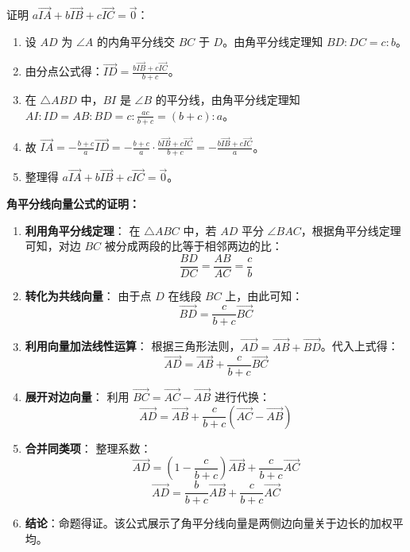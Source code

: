\begin{proofbox}
证明 $a\vec{IA} + b\vec{IB} + c\vec{IC} = \vec{0}$：
\begin{enumerate}
    \item 设 $AD$ 为 $\angle A$ 的内角平分线交 $BC$ 于 $D$。由角平分线定理知 $BD:DC = c:b$。
    \item 由分点公式得：$\vec{ID} = \frac{b\vec{IB} + c\vec{IC}}{b+c}$。
    \item 在 $\triangle ABD$ 中，$BI$ 是 $\angle B$ 的平分线，由角平分线定理知 $AI:ID = AB:BD = c:\frac{ac}{b+c} = (b+c):a$。
    \item 故 $\vec{IA} = -\frac{b+c}{a}\vec{ID} = -\frac{b+c}{a} \cdot \frac{b\vec{IB} + c\vec{IC}}{b+c} = -\frac{b\vec{IB} + c\vec{IC}}{a}$。
    \item 整理得 $a\vec{IA} + b\vec{IB} + c\vec{IC} = \vec{0}$。
\end{enumerate}
\end{proofbox}

\begin{proofbox}
\textbf{角平分线向量公式的证明：}
\begin{enumerate}
    \item \textbf{利用角平分线定理}：
    在 $\triangle ABC$ 中，若 $AD$ 平分 $\angle BAC$，根据角平分线定理可知，对边 $BC$ 被分成两段的比等于相邻两边的比：
    \[ \frac{BD}{DC} = \frac{AB}{AC} = \frac{c}{b} \]
    
    \item \textbf{转化为共线向量}：
    由于点 $D$ 在线段 $BC$ 上，由此可知：
    \[ \vec{BD} = \frac{c}{b+c} \vec{BC} \]
    
    \item \textbf{利用向量加法线性运算}：
    根据三角形法则，$\vec{AD} = \vec{AB} + \vec{BD}$。代入上式得：
    \[ \vec{AD} = \vec{AB} + \frac{c}{b+c} \vec{BC} \]
    
    \item \textbf{展开对边向量}：
    利用 $\vec{BC} = \vec{AC} - \vec{AB}$ 进行代换：
    \[ \vec{AD} = \vec{AB} + \frac{c}{b+c} (\vec{AC} - \vec{AB}) \]
    
    \item \textbf{合并同类项}：
    整理系数：
    \[ \vec{AD} = \left( 1 - \frac{c}{b+c} \right) \vec{AB} + \frac{c}{b+c} \vec{AC} \]
    \[ \vec{AD} = \frac{b}{b+c} \vec{AB} + \frac{c}{b+c} \vec{AC} \]
    
    \item \textbf{结论}：命题得证。该公式展示了角平分线向量是两侧边向量关于边长的加权平均。
\end{enumerate}
\end{proofbox}

